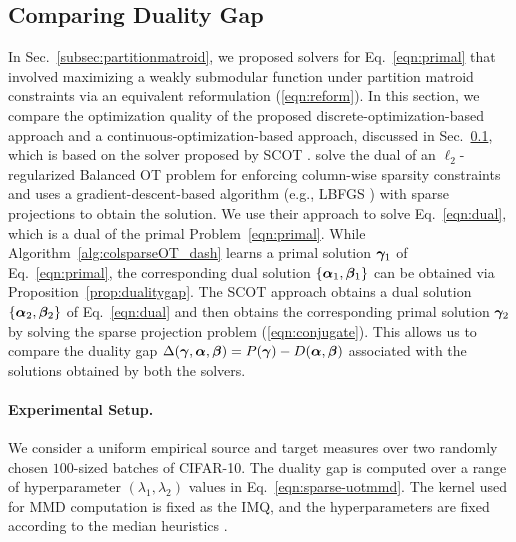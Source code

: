 \subsection{Comparing Duality Gap}\label{subsec:dualitygapcomparison}
In Sec.~\ref{subsec:partitionmatroid}, we proposed solvers for Eq.~\ref{eqn:primal} that involved maximizing a weakly submodular function under partition matroid constraints via an equivalent reformulation (\ref{eqn:reform}).
In this section, we compare the optimization quality of the proposed discrete-optimization-based approach and a continuous-optimization-based approach, discussed in Sec.~\ref{subsec:dualitygapcomparison}, which is based on the solver proposed by SCOT \citep{liu2023sparsityconstrained}.
\citet{liu2023sparsityconstrained} solve the dual of an $\ell_2$-regularized Balanced OT problem for enforcing column-wise sparsity constraints and uses a gradient-descent-based algorithm (e.g., LBFGS \citep{LBFGS}) with sparse projections to obtain the solution. We use their approach to solve Eq.~\ref{eqn:dual}, which is a dual of the primal Problem~\ref{eqn:primal}.
While Algorithm~\ref{alg:colsparseOT_dash} learns a primal solution $\bm{\gamma}_1$ of Eq.~\ref{eqn:primal}, the corresponding dual solution $\{\bm{\alpha}_1,\bm{\beta}_1\}$ can be obtained via Proposition~\ref{prop:dualitygap}. 
The SCOT approach obtains a dual solution $\{\bm{\alpha}_2,\bm{\beta}_2\}$ of Eq.~\ref{eqn:dual} and then obtains the corresponding primal solution $\bm{\gamma}_2$ by solving the sparse projection problem (\ref{eqn:conjugate}). This allows us to compare the duality gap $\Delta(\bm{\gamma},\bm{\alpha},\bm{\beta}) = P(\bm{\gamma})-D(\bm{\alpha},\bm{\beta})$ associated with the solutions obtained by both the solvers. 

\paragraph{Experimental Setup.} We consider a uniform empirical source and target measures over two randomly chosen $100$-sized batches of CIFAR-10. The duality gap is computed over 
a range of hyperparameter $(\lambda_1,\lambda_2)$ values in Eq.~\ref{eqn:sparse-uotmmd}. The kernel used for MMD computation is fixed as the IMQ, and the hyperparameters are fixed according to the median heuristics \citep{gretton12a}.


